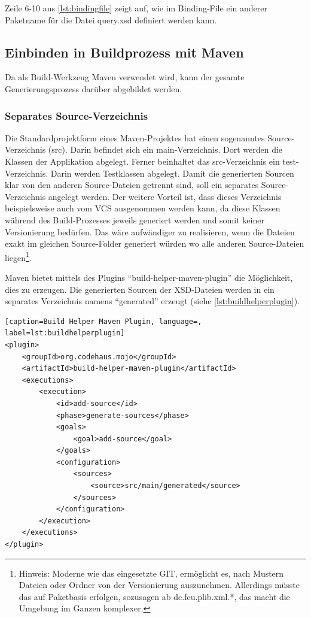 Zeile 6-10 aus \autoref{lst:bindingfile} zeigt auf, wie im Binding-File ein anderer Paketname für die Datei query.xsd definiert werden kann. 

\subsection{Einbinden in Buildprozess mit Maven}
Da als Build-Werkzeug \gls{Maven} verwendet wird, kann der gesamte Generierungsprozess darüber abgebildet werden. 

\subsubsection{Separates Source-Verzeichnis}
Die Standardprojektform eines \gls{Maven}-Projektes hat einen sogenanntes Source-Verzeichnis (src). Darin befindet sich ein main-Verzeichnis. Dort werden die Klassen der Applikation abgelegt. Ferner beinhaltet das src-Verzeichnis ein test-Verzeichnis. Darin werden Testklassen abgelegt. 
Damit die generierten Sourcen klar von den anderen Source-Dateien getrennt sind, soll ein separates Source-Verzeichnis angelegt werden. Der weitere Vorteil ist, dass dieses Verzeichnis beispielsweise auch vom \gls{VCS} ausgenommen werden kann, da diese Klassen während des Build-Prozesses jeweils generiert werden und somit keiner Versionierung bedürfen. Das wäre aufwändiger zu realisieren, wenn die Dateien exakt im gleichen Source-Folder generiert würden wo alle anderen Source-Dateien liegen\footnote{Hinweis: Moderne  wie das eingesetzte GIT, ermöglicht es, nach Mustern Dateien oder Ordner von der Versionierung auszunehmen. Allerdings müsste das auf Paketbasis erfolgen, sozusagen ab de.feu.plib.xml.*, das macht die Umgebung im Ganzen komplexer.}. 

\gls{Maven} bietet mittels des Plugins \enquote{build-helper-maven-plugin} die Möglichkeit, dies zu erzeugen. 
Die generierten Sourcen der XSD-Dateien werden in ein separates Verzeichnis namens \enquote{generated} erzeugt (siehe \autoref{lst:buildhelperplugin}). 

\begin{lstlisting}[caption=Build Helper Maven Plugin, language=, label=lst:buildhelperplugin]
<plugin>
    <groupId>org.codehaus.mojo</groupId>
    <artifactId>build-helper-maven-plugin</artifactId>
    <executions>
        <execution>
            <id>add-source</id>
            <phase>generate-sources</phase>
            <goals>
                <goal>add-source</goal>
            </goals>
            <configuration>
                <sources>
                    <source>src/main/generated</source>
                </sources>
            </configuration>
        </execution>
    </executions>
</plugin>
\end{lstlisting}

